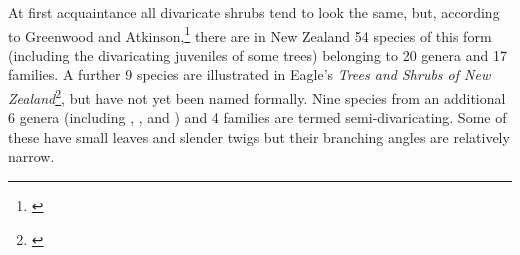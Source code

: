 At first acquaintance all divaricate shrubs tend to look the same, but, according to Greenwood and Atkinson,\footnote{\cite{greenwood1977evolution}} there are in New Zealand 54 species of this form (including the divaricating juveniles of some trees) belonging to 20 genera and 17 families.
A further 9 species are illustrated in Eagle's \emph{Trees and Shrubs of New Zealand}\footnote{\cite{eagle1982trees}}, but have not yet been named formally.
Nine species from an additional 6 genera (including , ,  and ) and 4 families are termed semi-divaricating.
Some of these have small leaves and slender twigs but their branching angles are relatively narrow.

